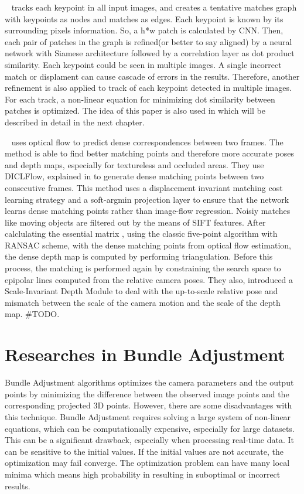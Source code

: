 \documentclass[11pt]{article}
\begin{document}
    ~\cite{Dusmanu2020Multi} tracks each keypoint in all input images, and creates a tentative
    matches graph with keypoints as nodes and matches as edges. Each keypoint is known by its surrounding pixels
    information. So, a h*w patch is calculated by CNN. Then, each pair of patches in the graph is refined(or better
    to say aligned) by a neural network with Siamese architecture followed by a correlation layer as dot product
    similarity. Each keypoint could be seen in multiple images. A single incorrect match or displament can cause
    cascade of errors in the results. Therefore, another refinement is also applied to track of each keypoint
    detected in multiple images. For each track, a non-linear equation for minimizing dot similarity between
    patches is optimized. The idea of this paper is also used in \cite{lindenberger2021pixsfm} which will be
    described in detail in the next chapter.

    ~\cite{wang2021deep} uses optical flow to predict dense correspondences between two frames. The method is
    able to find better matching points and therefore more accurate poses and depth maps, especially for
    textureless and occluded areas. They use DICLFlow, explained in \cite{wang2020displacement} to generate
    dense matching points between two consecutive frames. This method uses a displacement invariant matching
    cost learning strategy and a soft-argmin projection layer to ensure that the network learns dense matching
    points rather than image-flow regression. Noisiy matches like moving
    objects are filtered out by the means of SIFT features. After calclulating the essential matrix , using
    the classic five-point algorithm with RANSAC scheme, with the dense matching points from optical flow estimation,
    the dense depth map is computed by performing triangulation. Before this process, the matching is performed
    again by constraining the search space to epipolar lines computed from the relative camera poses. They also,
    introduced a Scale-Invariant Depth Module to deal with the up-to-scale relative pose and mismatch between the
    scale of the camera motion and the scale of the depth map. #TODO.

    \newpage
    \section{Researches in Bundle Adjustment}
    Bundle Adjustment algorithms optimizes the camera parameters and the output points by minimizing the
    difference between the observed image points and the corresponding projected 3D points. However, there
    are some disadvantages with this technique. Bundle Adjustment requires solving a large system of
    non-linear equations, which can be computationally expensive, especially for large datasets. This can be a
    significant drawback, especially when processing real-time data. It can be sensitive to the initial values.
    If the initial values are not accurate, the optimization may fail converge. The optimization problem can have
    many local minima which means high probability in resulting in suboptimal or incorrect results.
\end{document}
